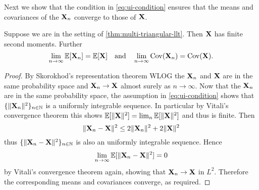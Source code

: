 Next we show that the condition in \cref{eq:ui-condition} ensures that the means and covariances of the ${\mathbf X}_n$ converge to those of ${\mathbf X}$.
\begin{lemma}
    \label{lem:cvg-mean-var}
    Suppose we are in the setting of \cref{thm:multi-triangular-llt}. Then ${\mathbf X}$ has finite second moments. Further
    \begin{equation*}
        \lim_{n \to \infty} {\mathbb E}[{\mathbf X}_n] = {\mathbb E}[{\mathbf X}]
        \quad \text{and} \quad 
        \lim_{n \to \infty} \operatorname{Cov}({\mathbf X}_n) = \operatorname{Cov}({\mathbf X}).
    \end{equation*}
\end{lemma}
\begin{proof}
    By Skorokhod's representation theorem WLOG the ${\mathbf X}_n$ and ${\mathbf X}$ are in the same probability space and ${\mathbf X}_n \to {\mathbf X}$ almost surely as $n \to \infty$. Now that the ${\mathbf X}_n$ are in the same probability space, the assumption in \cref{eq:ui-condition} shows that $\{\lVert{\mathbf X}_n\rVert^2\}_{n \in {\mathbb N}}$ is a uniformly integrable sequence. In particular by Vitali's convergence theorem this shows ${\mathbb E}[\lVert{\mathbf X}\rVert^2] = \lim_n {\mathbb E}[\lVert{\mathbf X}\rVert^2]$ and thus is finite. Then
    \begin{equation*}
        \lVert{\mathbf X}_n - {\mathbf X}\rVert^2 \leq 2 \lVert{\mathbf X}_n\rVert^2 + 2 \lVert{\mathbf X}\rVert^2
    \end{equation*}
    thus $\{\lVert{\mathbf X}_n - {\mathbf X}\rVert^2\}_{n \in {\mathbb N}}$ is also an uniformly integrable sequence. Hence 
    \begin{equation*}
        \lim_{n \to \infty} {\mathbb E}[\lVert{\mathbf X}_n - {\mathbf X}\rVert^2] = 0  
    \end{equation*}
    by Vitali's convergence theorem again, showing that ${\mathbf X}_n \to {\mathbf X}$ in $L^2$. Therefore the corresponding means and covariances converge, as required.
\end{proof}

